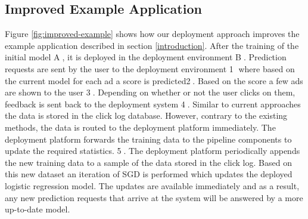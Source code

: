 \subsection{Improved Example Application}
Figure \ref{fig:improved-example} shows how our deployment approach improves the example application described in section \ref{introduction}.
After the training of the initial model \textcircled{A}, it is deployed in the deployment environment \textcircled{B}.
Prediction requests are sent by the user to the deployment environment \textcircled{1} where based on the current model for each ad a score is predicted\textcircled{2}.
Based on the score a few ads are shown to the user \textcircled{3}.
Depending on whether or not the user clicks on them, feedback is sent back to the deployment system \textcircled{4}.
Similar to current approaches the data is stored in the click log database.
However, contrary to the existing methods, the data is routed to the deployment platform immediately.
The deployment platform forwards the training data to the pipeline components to update the required statistics. \textcircled{5}.
The deployment platform periodically appends the new training data to a sample of the data stored in the click log.
Based on this new dataset an iteration of SGD is performed which updates the deployed logistic regression model.
The updates are available immediately and as a result, any new prediction requests that arrive at the system will be answered by a more up-to-date model.

